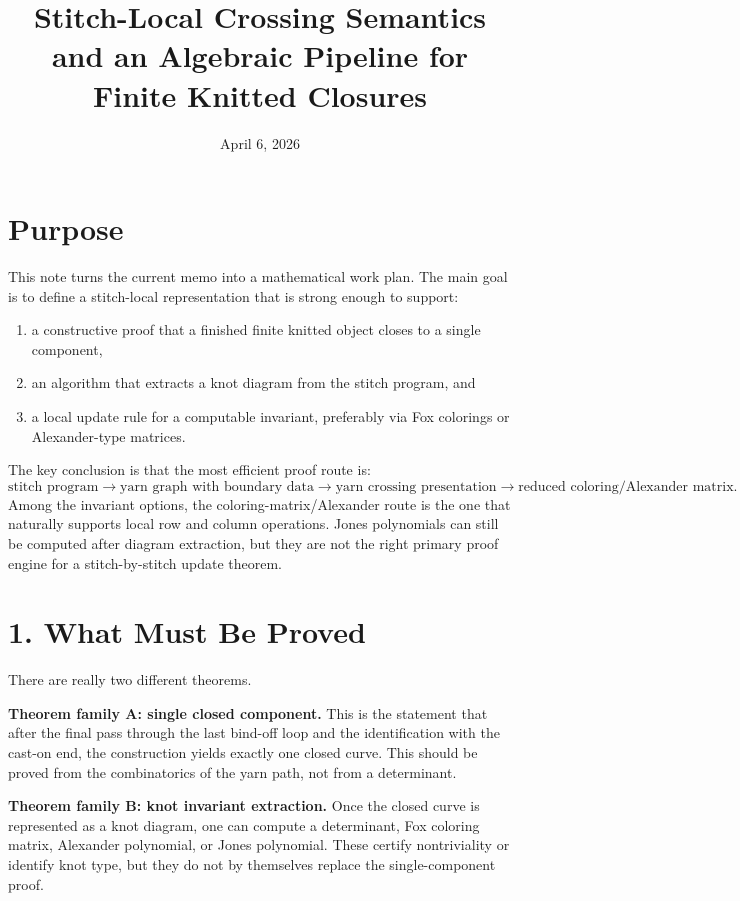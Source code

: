 \documentclass[11pt]{article}
\title{Stitch-Local Crossing Semantics and an Algebraic Pipeline for Finite Knitted Closures}
\author{}
\date{April 6, 2026}
\begin{document}
\maketitle
\thispagestyle{empty}

\section*{Purpose}
This note turns the current memo into a mathematical work plan. The main goal is to define a stitch-local representation that is strong enough to support:
\begin{enumerate}[leftmargin=1.5em,itemsep=0.25em]
    \item a constructive proof that a finished finite knitted object closes to a single component,
    \item an algorithm that extracts a knot diagram from the stitch program, and
    \item a local update rule for a computable invariant, preferably via Fox colorings or Alexander-type matrices.
\end{enumerate}

The key conclusion is that the most efficient proof route is:
\[
\text{stitch program} \to \text{yarn graph with boundary data} \to \text{yarn crossing presentation} \to \text{reduced coloring/Alexander matrix}.
\]
Among the invariant options, the coloring-matrix/Alexander route is the one that naturally supports local row and column operations. Jones polynomials can still be computed after diagram extraction, but they are not the right primary proof engine for a stitch-by-stitch update theorem.

\section*{1. What Must Be Proved}
There are really two different theorems.

\textbf{Theorem family A: single closed component.}  
This is the statement that after the final pass through the last bind-off loop and the identification with the cast-on end, the construction yields exactly one closed curve. This should be proved from the combinatorics of the yarn path, not from a determinant.

\textbf{Theorem family B: knot invariant extraction.}  
Once the closed curve is represented as a knot diagram, one can compute a determinant, Fox coloring matrix, Alexander polynomial, or Jones polynomial. These certify nontriviality or identify knot type, but they do not by themselves replace the single-component proof.
\end{document}
